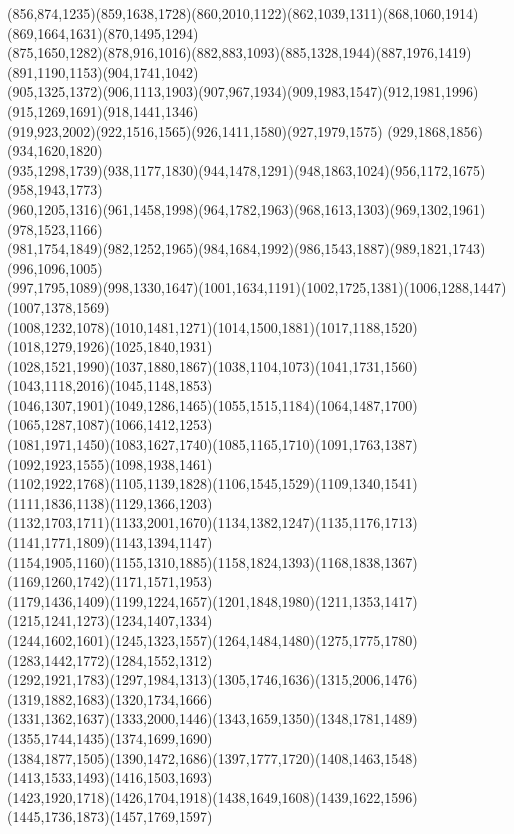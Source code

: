 \documentclass[a4paper,twopage,reqno,12pt]{amsart}
\theoremstyle{definition}
\numberwithin{equation}{section}
\begin{document}
\begin{enumerate}
{{(856,874,1235)(859,1638,1728)(860,2010,1122)(862,1039,1311)(868,1060,1914)(869,1664,1631)(870,1495,1294)\\(875,1650,1282)(878,916,1016)(882,883,1093)(885,1328,1944)(887,1976,1419)(891,1190,1153)(904,1741,1042)\\(905,1325,1372)(906,1113,1903)(907,967,1934)(909,1983,1547)(912,1981,1996)(915,1269,1691)(918,1441,1346)\\
(919,923,2002)(922,1516,1565)(926,1411,1580)(927,1979,1575)
(929,1868,1856)(934,1620,1820)\\
(935,1298,1739)(938,1177,1830)(944,1478,1291)(948,1863,1024)(956,1172,1675)(958,1943,1773)\\
(960,1205,1316)(961,1458,1998)(964,1782,1963)(968,1613,1303)(969,1302,1961)(978,1523,1166)\\
(981,1754,1849)(982,1252,1965)(984,1684,1992)(986,1543,1887)(989,1821,1743)(996,1096,1005)\\
(997,1795,1089)(998,1330,1647)(1001,1634,1191)(1002,1725,1381)(1006,1288,1447)(1007,1378,1569)\\(1008,1232,1078)(1010,1481,1271)(1014,1500,1881)(1017,1188,1520)(1018,1279,1926)(1025,1840,1931)\\
(1028,1521,1990)(1037,1880,1867)(1038,1104,1073)(1041,1731,1560)(1043,1118,2016)(1045,1148,1853)\\(1046,1307,1901)(1049,1286,1465)(1055,1515,1184)(1064,1487,1700)(1065,1287,1087)(1066,1412,1253)\\(1081,1971,1450)(1083,1627,1740)(1085,1165,1710)(1091,1763,1387)(1092,1923,1555)(1098,1938,1461)\\(1102,1922,1768)(1105,1139,1828)(1106,1545,1529)(1109,1340,1541)(1111,1836,1138)(1129,1366,1203)\\
(1132,1703,1711)(1133,2001,1670)(1134,1382,1247)(1135,1176,1713)(1141,1771,1809)(1143,1394,1147)\\(1154,1905,1160)(1155,1310,1885)(1158,1824,1393)(1168,1838,1367)(1169,1260,1742)(1171,1571,1953)\\(1179,1436,1409)(1199,1224,1657)(1201,1848,1980)(1211,1353,1417)(1215,1241,1273)(1234,1407,1334)\\(1244,1602,1601)(1245,1323,1557)(1264,1484,1480)(1275,1775,1780)(1283,1442,1772)(1284,1552,1312)\\
(1292,1921,1783)(1297,1984,1313)(1305,1746,1636)(1315,2006,1476)(1319,1882,1683)(1320,1734,1666)\\(1331,1362,1637)(1333,2000,1446)(1343,1659,1350)(1348,1781,1489)(1355,1744,1435)(1374,1699,1690)\\(1384,1877,1505)(1390,1472,1686)(1397,1777,1720)(1408,1463,1548)(1413,1533,1493)(1416,1503,1693)\\(1423,1920,1718)(1426,1704,1918)(1438,1649,1608)(1439,1622,1596)(1445,1736,1873)(1457,1769,1597)\\
}}
\end{enumerate}
\end{document}
